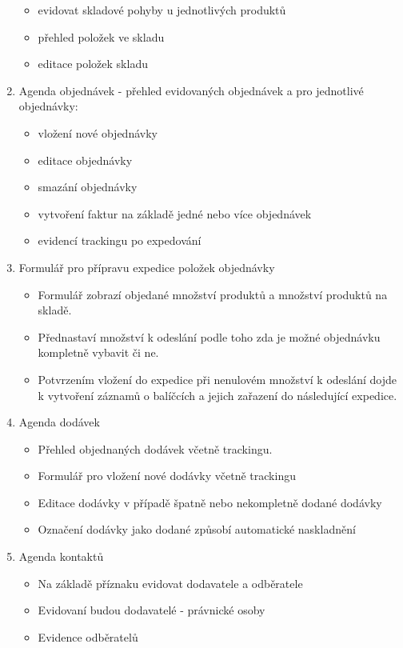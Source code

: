 \documentclass[thesis=B,czech]{FITthesis}[2012/06/26]
\begin{document}
\begin{enumerate}
		\begin{itemize}
			\item evidovat skladové pohyby u jednotlivých produktů
			\item přehled položek ve skladu
			\item editace položek skladu
		\end{itemize}
	\item Agenda objednávek - přehled evidovaných objednávek a pro jednotlivé objednávky:
	\begin{itemize}
		\item vložení nové objednávky
		\item editace objednávky
		\item smazání objednávky
		\item vytvoření faktur na základě jedné nebo více objednávek
		\item evidencí trackingu po expedování
	\end{itemize}
	\item Formulář pro přípravu expedice položek objednávky
	\begin{itemize}
		\item Formulář zobrazí objedané množství produktů a množství produktů na skladě. 
		\item Přednastaví množství k odeslání podle toho zda je možné objednávku kompletně vybavit či ne.
		\item Potvrzením vložení do expedice při nenulovém množství k odeslání dojde k vytvoření záznamů o balíčcích a jejich zařazení do následující expedice.
	\end{itemize}
	\item Agenda dodávek
	\begin{itemize}
		\item Přehled objednaných dodávek včetně trackingu.
		\item Formulář pro vložení nové dodávky včetně trackingu
		\item Editace dodávky v případě špatně nebo nekompletně dodané dodávky
		\item Označení dodávky jako dodané způsobí automatické naskladnění
	\end{itemize}
	\item Agenda kontaktů
	\begin{itemize}
		\item Na základě příznaku evidovat dodavatele a odběratele
		\item Evidovaní budou dodavatelé - právnické osoby
		\item Evidence odběratelů

\end{itemize}
\end{enumerate}
\end{document}
